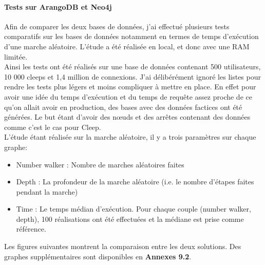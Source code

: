 \documentclass{article} %
\begin{document}
\paragraph{Tests sur ArangoDB et Neo4j\\}
Afin de comparer les deux bases de données, j'ai effectué plusieurs tests comparatifs sur les bases de données notamment en termes de temps d'exécution d'une marche aléatoire. L'étude a été réalisée en local, et donc avec une RAM limitée.\\
Ainsi les tests ont été réalisés sur une base de données contenant 500 utilisateurs, 10 000 cleeps et 1,4 million de connexions. J'ai délibérément ignoré les listes pour rendre les tests plus légers et moins compliquer à mettre en place. En effet pour avoir une idée du temps d'exécution et du temps de requête assez proche de ce qu'on allait avoir en production, des bases avec des données factices ont été générées. Le but étant d'avoir des nœuds et des arrêtes contenant des données comme c'est le cas pour Cleep.\\
L'étude étant réalisée sur la marche aléatoire, il y a trois paramètres sur chaque graphe: 
\begin{itemize}
 \item Number walker : Nombre de marches aléatoires faites
 \item Depth : La profondeur de la marche aléatoire (i.e. le nombre d'étapes faites pendant la marche)
 \item Time : Le temps médian d’exécution. Pour chaque couple (number walker, depth), 100 réalisations ont été effectuées et la médiane est prise comme référence.
\end{itemize} 
Les figures suivantes montrent la comparaison entre les deux solutions. Des graphes supplémentaires sont disponibles en \textbf{Annexes 9.2}.
\end{document}
